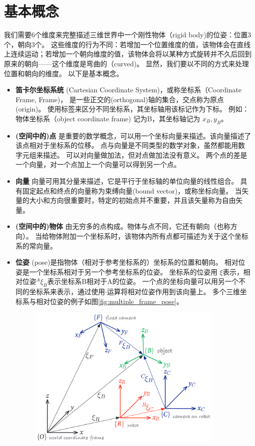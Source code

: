 \documentclass[UTF8,a4paper,10pt]{ctexart}
\begin{document}
\section{基本概念}\label{sec:concepts}
我们需要6个维度来完整描述三维世界中一个刚性物体（rigid body)的位姿：位置3个，朝向3个。
这些维度的行为不同：若增加一个位置维度的值，该物体会在直线上连续运动；若增加一个朝向维度的值，该物体会将以某种方式旋转并不久后回到原来的朝向——这个维度是弯曲的（curved)。
显然，我们要以不同的方式来处理位置和朝向的维度。
以下是基本概念。
\begin{itemize}
\item{\textbf{笛卡尔坐标系统}}
  (Cartesian Coordinate System)，或称坐标系（Coordinate Frame, Frame)，
  是一些正交的(orthogonal)轴的集合，交点称为原点(origin)。
  使用标签来区分不同坐标系，其坐标轴用该标记作为下标。
  例如：物体坐标系（object coordinate frame) 记为{B}，其坐标轴记为 $x_B, y_B$。
\item{\textbf{(空间中的)点}}
  是重要的数学概念，可以用一个坐标向量来描述。该向量描述了该点相对于坐标系的位移。
  点与向量是不同类型的数学对象，虽然都能用数字元组来描述。
  可以对向量做加法，但对点做加法没有意义。
  两个点的差是一个向量，对一个点加上一个向量可以得到另一个点。
\item{\textbf{向量}}
  向量可用其分量来描述，它是平行于坐标轴的单位向量的线性组合。
  具有固定起点和终点的向量称为束缚向量(bound vector)，或称坐标向量。
  当矢量的大小和方向很重要时，特定的初始点并不重要，并且该矢量称为自由矢量。
\item{\textbf{(空间中的)物体}}
  由无穷多的点构成。物体与点不同，它还有朝向（也称方向）。
  当给物体附加一个坐标系时，该物体内所有点都可描述为关于这个坐标系的常向量。
\item{\textbf{位姿}}
  (pose)是指物体（相对于参考坐标系的）坐标系的位置和朝向。
  相对位姿是一个坐标系相对于另一个参考坐标系的位姿。
  坐标系的位姿用 $\xi$表示，相对位姿${}^A\xi_B$表示坐标系{B}相对于{A}的位姿。
  一个点的坐标向量可以用另一个不同的坐标系来表示，通过使用$\cdot$运算将相对位姿作用到该向量上。
  多个三维坐标系与相对位姿的例子如图\ref{fig:multiple_frame_pose}。
\begin{figure}[htbp]
  \centerline{\includegraphics[width=0.9\textwidth]{multiple_frame_pose}}

\end{figure}
\end{itemize}
\end{document}
